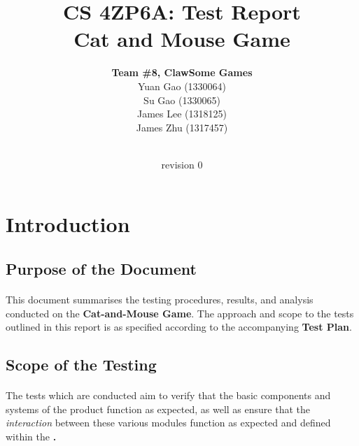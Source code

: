 \documentclass{article}
\title{CS 4ZP6A: Test Report\\Cat and Mouse Game}
\author{\textbf{Team \#8, ClawSome Games}
		\\ Yuan Gao (1330064)
		\\ Su Gao (1330065)
		\\ James Lee (1318125)
		\\ James Zhu (1317457) 
}
\date{\displaydate{date}\\revision 0}
\begin{document}
\maketitle
\newpage
\begin{versionhistory}
\end{versionhistory}

\tableofcontents
\newpage
{}

\section{Introduction}

\subsection{Purpose of the Document}
\paragraph{}This document summarises the testing procedures, results, and analysis conducted on the \textbf{Cat-and-Mouse Game}. The approach and scope to the tests outlined in this report is as specified according to the accompanying \textbf{Test Plan}.

\subsection{Scope of the Testing}
\paragraph{}The tests which are conducted aim to verify that the basic components and systems of the product function as expected, as well as ensure that the \emph{interaction} between these various modules function as expected and defined within the \textbf.
\end{document}
